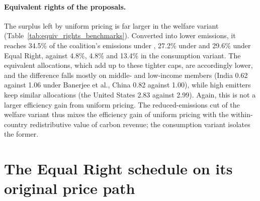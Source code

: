 \documentclass[12pt,english]{article}
\theoremstyle{remark}
\begin{document}
\paragraph{Equivalent rights of the proposals.} The surplus left by uniform pricing is far larger in the welfare variant (Table~\ref{tab:equiv_rights_benchmarks}). Converted into lower emissions, it reaches 34.5\% of the coalition's emissions under \citet{wolfram_building_2025}, 27.2\% under \citet{banerjee_grand_2025} and 29.6\% under Equal Right, against 4.8\%, 4.8\% and 13.4\% in the consumption variant. The equivalent allocations, which add up to these tighter caps, are accordingly lower, and the difference falls mostly on middle- and low-income members (India 0.62 against 1.06 under Banerjee et al., China 0.82 against 1.00), while high emitters keep similar allocations (the United States 2.83 against 2.99). Again, this is not a larger efficiency gain from uniform pricing. %
The reduced-emissions cut of the welfare variant thus mixes the efficiency gain of uniform pricing with the within-country redistributive value of carbon revenue; the consumption variant isolates the former. %


\clearpage
\section{The Equal Right schedule on its original price path}
\label{app:ede}
\end{document}
